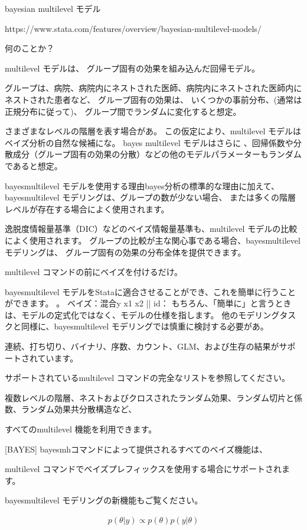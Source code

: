 \documentclass[a4j,11pt,mc, twocolumn]{jreport}
\begin{document}
	bayesian multilevel モデル

	https://www.stata.com/features/overview/bayesian-multilevel-models/

	何のことか？

	multilevel モデルは、
	グループ固有の効果を組み込んだ回帰モデル。

	グループは、病院、病院内にネストされた医師、病院内にネストされた医師内にネストされた患者など、
	グループ固有の効果は、
	いくつかの事前分布、(通常は正規分布に従って)、
	グループ間でランダムに変化すると想定。


	さまざまなレベルの階層を表す場合があ。
	この仮定により、multilevel モデルはベイズ分析の自然な候補にな。
	bayes multilevel モデルはさらに
	、回帰係数や分散成分（グループ固有の効果の分散）などの他のモデルパラメーターもランダムであると想定。


	bayesmultilevel モデルを使用する理由bayes分析の標準的な理由に加えて、
	bayesmultilevel モデリングは、グループの数が少ない場合、
	または多くの階層レベルが存在する場合によく使用されます。

	逸脱度情報量基準（DIC）などのベイズ情報量基準も、multilevel モデルの比較によく使用されます。
	グループの比較が主な関心事である場合、bayesmultilevel モデリングは、
	グループ固有の効果の分布全体を提供できます。

	multilevel コマンドの前にベイズを付けるだけ。


	bayesmultilevel モデルをStataに適合させることができ、これを簡単に行うことができます。
	。
	ベイズ：混合y x1 x2 || id：
	もちろん、「簡単に」と言うときは、モデルの定式化ではなく、モデルの仕様を指します。
	他のモデリングタスクと同様に、bayesmultilevel モデリングでは慎重に検討する必要があ。


	連続、打ち切り、バイナリ、序数、カウント、GLM、および生存の結果がサポートされています。

	サポートされているmultilevel コマンドの完全なリストを参照してください。

	複数レベルの階層、ネストおよびクロスされたランダム効果、ランダム切片と係数、ランダム効果共分散構造など、

	すべてのmultilevel 機能を利用できます。


	 [BAYES] bayesmhコマンドによって提供されるすべてのベイズ機能は、

	 multilevel コマンドでベイズプレフィックスを使用する場合にサポートされます。

	bayesmultilevel モデリングの新機能もご覧ください。


\begin{eqnarray}
   p(\theta|y) \propto p(\theta)p(y|\theta)
\end{eqnarray}
\end{document}
